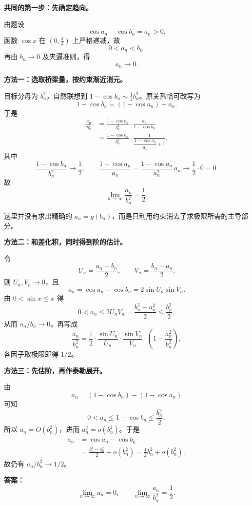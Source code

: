 \begin{solutionBox}
\textbf{共同的第一步：先确定趋向。}

由题设
\[
\cos a_n-\cos b_n=a_n>0.
\]
函数 \(\cos x\) 在 \(\left(0,\frac{\pi}{2}\right)\) 上严格递减，故
\[
0<a_n<b_n.
\]
再由 \(b_n\to0\) 及夹逼准则，得
\[
\boxed{a_n\to0}.
\]

\textbf{方法一：选取桥梁量，按约束渐近消元。}

目标分母为 \(b_n^2\)，自然联想到
\(1-\cos b_n\sim\frac12b_n^2\)。原关系恰可改写为
\[
1-\cos b_n=(1-\cos a_n)+a_n.
\]
于是
\begin{align*}
\frac{a_n}{b_n^2}
&=\frac{1-\cos b_n}{b_n^2}
  \cdot\frac{a_n}{1-\cos b_n}\\
&=\frac{1-\cos b_n}{b_n^2}
  \cdot\frac{1}{\dfrac{1-\cos a_n}{a_n}+1}.
\end{align*}
其中
\[
\frac{1-\cos b_n}{b_n^2}\to\frac12,
\qquad
\frac{1-\cos a_n}{a_n}
=\frac{1-\cos a_n}{a_n^2}\,a_n\to\frac12\cdot0=0.
\]
故
\[
\boxed{\lim_{n\to\infty}\frac{a_n}{b_n^2}=\frac12}.
\]

这里并没有求出精确的 \(a_n=g(b_n)\)，而是只利用约束消去了求极限所需的主导部分。

\textbf{方法二：和差化积，同时得到阶的估计。}

令
\[
U_n=\frac{a_n+b_n}{2},\qquad V_n=\frac{b_n-a_n}{2}.
\]
则 \(U_n,V_n\to0\)，且
\[
a_n=\cos a_n-\cos b_n=2\sin U_n\sin V_n.
\]
由 \(0<\sin x\le x\) 得
\[
0<a_n\le 2U_nV_n
=\frac{b_n^2-a_n^2}{2}\le\frac{b_n^2}{2},
\]
从而 \(a_n/b_n\to0\)。再写成
\[
\frac{a_n}{b_n^2}
=\frac12\cdot\frac{\sin U_n}{U_n}
\cdot\frac{\sin V_n}{V_n}
\cdot\left(1-\frac{a_n^2}{b_n^2}\right),
\]
各因子取极限即得 \(1/2\)。

\textbf{方法三：先估阶，再作泰勒展开。}

由
\[
a_n=(1-\cos b_n)-(1-\cos a_n)
\]
可知
\[
0<a_n\le1-\cos b_n\le\frac{b_n^2}{2},
\]
所以 \(a_n=O(b_n^2)\)，进而 \(a_n^2=o(b_n^2)\)。于是
\begin{align*}
a_n
&=\cos a_n-\cos b_n\\
&=\frac{b_n^2-a_n^2}{2}+o(b_n^2)
=\frac12b_n^2+o(b_n^2),
\end{align*}
故仍有 \(a_n/b_n^2\to1/2\)。

\textbf{答案：}
\[
\boxed{\lim_{n\to\infty}a_n=0,\qquad
\lim_{n\to\infty}\frac{a_n}{b_n^2}=\frac12}.
\]
\end{solutionBox}

